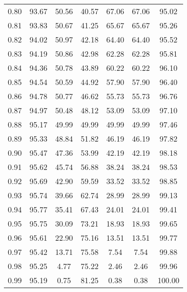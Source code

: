 \begin{tabular}{|c|c|c|c|c|c|c|}
      0.80 &     93.67 &     50.56 &      40.57 &   67.06 &      67.06 &         95.02 \\
      0.81 &     93.83 &     50.67 &      41.25 &   65.67 &      65.67 &         95.26 \\
      0.82 &     94.02 &     50.97 &      42.18 &   64.40 &      64.40 &         95.52 \\
      0.83 &     94.19 &     50.86 &      42.98 &   62.28 &      62.28 &         95.81 \\
      0.84 &     94.36 &     50.78 &      43.89 &   60.22 &      60.22 &         96.10 \\
      0.85 &     94.54 &     50.59 &      44.92 &   57.90 &      57.90 &         96.40 \\
      0.86 &     94.78 &     50.77 &      46.62 &   55.73 &      55.73 &         96.76 \\
      0.87 &     94.97 &     50.48 &      48.12 &   53.09 &      53.09 &         97.10 \\
      0.88 &     95.17 &     49.99 &      49.99 &   49.99 &      49.99 &         97.46 \\
      0.89 &     95.33 &     48.84 &      51.82 &   46.19 &      46.19 &         97.82 \\
      0.90 &     95.47 &     47.36 &      53.99 &   42.19 &      42.19 &         98.18 \\
      0.91 &     95.62 &     45.74 &      56.88 &   38.24 &      38.24 &         98.53 \\
      0.92 &     95.69 &     42.90 &      59.59 &   33.52 &      33.52 &         98.85 \\
      0.93 &     95.74 &     39.66 &      62.74 &   28.99 &      28.99 &         99.13 \\
      0.94 &     95.77 &     35.41 &      67.43 &   24.01 &      24.01 &         99.41 \\
      0.95 &     95.75 &     30.09 &      73.21 &   18.93 &      18.93 &         99.65 \\
      0.96 &     95.61 &     22.90 &      75.16 &   13.51 &      13.51 &         99.77 \\
      0.97 &     95.42 &     13.71 &      75.58 &    7.54 &       7.54 &         99.88 \\
      0.98 &     95.25 &      4.77 &      75.22 &    2.46 &       2.46 &         99.96 \\
      0.99 &     95.19 &      0.75 &      81.25 &    0.38 &       0.38 &        100.00 \\
\bottomrule
\end{tabular}
